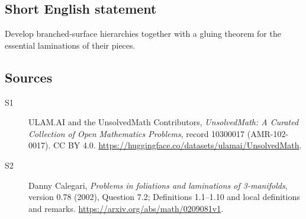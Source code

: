 \documentclass[11pt]{article}
\begin{document}
\subsection{Short English statement}
Develop branched-surface hierarchies together with a gluing theorem for the essential laminations of their pieces.
\subsection{Sources}
\begin{description}
\item[\hypertarget{source:10300017:1}{S1}] ULAM.AI and the UnsolvedMath Contributors, \emph{UnsolvedMath: A Curated Collection of Open Mathematics Problems}, record 10300017 (AMR-102-0017). CC BY 4.0. \url{https://huggingface.co/datasets/ulamai/UnsolvedMath}.
\item[\hypertarget{source:10300017:2}{S2}] Danny Calegari, \emph{Problems in foliations and laminations of 3-manifolds}, version 0.78 (2002), Question 7.2; Definitions 1.1--1.10 and local definitions and remarks. \url{https://arxiv.org/abs/math/0209081v1}.
\end{description}
\label{end:10300017}
\end{document}
